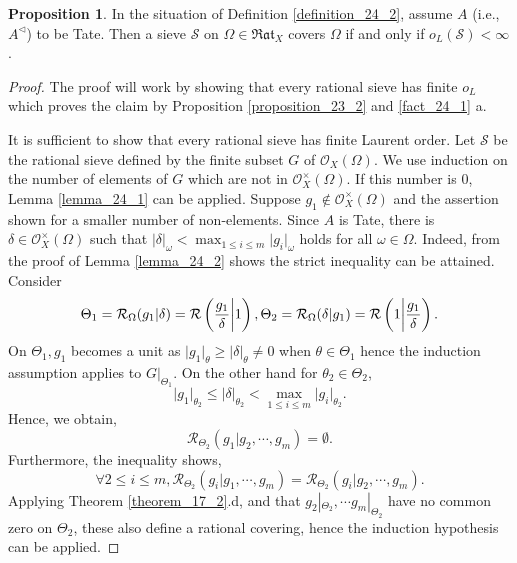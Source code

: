 \documentclass[10pt]{article}
\numberwithin{equation}{section}
\theoremstyle{definition}
\newtheorem{proposition}{Proposition}[subsection]
\newcommand{\cR}[0]{\mathcal{R}}
\newcommand{\ab}[1]{\vert #1 \vert}
\newcommand{\sS}[0]{\mathscr{S}}
\newcommand{\cO}[0]{\mathcal{O}}
\newcommand{\Rat}[0]{\mathfrak{Rat}}
\begin{document}
\begin{proposition}
    \label{proposition_24_5}
    In the situation of Definition \ref{definition_24_2}, assume $A$ (i.e., $A^\triangleleft$) to be Tate. Then a sieve $\sS$ on $\Omega\in\Rat_X$ covers $\Omega$ if and only if $o_L(\sS)<\infty$.
\end{proposition}
\begin{proof}
    The proof will work by showing that every rational sieve has finite $o_L$ which proves the claim by Proposition \ref{proposition_23_2} and \ref{fact_24_1} a.
    \par It is sufficient to show that every rational sieve has finite Laurent order. Let $\sS$ be the rational sieve defined by the finite subset $G$ of $\cO_X(\Omega)$. We use induction on the number of elements of $G$ which are not in $\mathcal{O}_X^\times(\Omega)$.
    If this number is $0$, Lemma \ref{lemma_24_1} can be applied. Suppose $g_1\not\in\mathcal{O}_X^\times(\Omega)$ and the assertion shown for a smaller number of non-elements.
    Since $A$ is Tate, there is $\delta\in\mathcal{O}_X^\times(\Omega)$ such that $\ab{\delta}_\omega <\max_{1\leq i\leq m}\ab{g_i}_\omega$ holds for all $\omega\in\Omega$. Indeed, from the proof of Lemma \ref{lemma_24_2} shows the strict inequality can be attained. Consider
    \begin{equation*}
        \Theta_1 = \cR_\Omega(g_1|\delta)=\cR\left({\frac {g_1} \delta}\bigg{\vert}1\right),\Theta_2 = \cR_\Omega(\delta|g_1) = \cR\left(1\bigg{\vert}{\frac {g_1} \delta}\right).
    \end{equation*}
    On $\Theta_1,g_1$ becomes a unit as $\ab{g_1}_\theta\geq\ab{\delta}_\theta\not=0$ when $\theta\in\Theta_1$ hence the induction assumption applies to $G|_{\Theta_1}$.
    On the other hand for $\theta_2\in\Theta_2$,
    \begin{equation*}
        \ab{g_1}_{\theta_2}\leq \ab{\delta}_{\theta_2}<\max_{1\leq i\leq m}\ab{g_i}_{\theta_2}.
    \end{equation*}
    Hence, we obtain,
    \begin{equation*}
        \cR_{\Theta_2}(g_1|g_2,\cdots,g_m) = \emptyset.
    \end{equation*}
    Furthermore, the inequality shows,
    \begin{equation*}
        \forall 2\leq i\leq m, \cR_{\Theta_2}(g_i|g_1,\cdots,g_m) = \cR_{\Theta_2}(g_i|g_2,\cdots,g_m).
    \end{equation*}
    Applying Theorem \ref{theorem_17_2}.d, and that $g_2|_{\Theta_2},\cdots g_m|_{\Theta_2}$ have no common zero on $\Theta_2$, these also define a rational covering, hence the induction hypothesis can be applied.
\end{proof}
\end{document}
